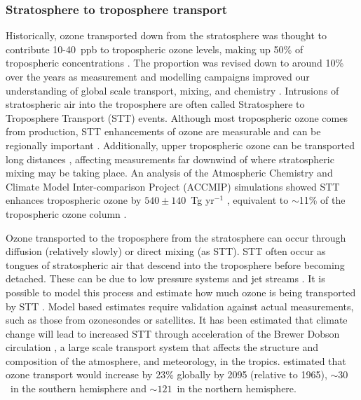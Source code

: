   \subsubsection{Stratosphere to troposphere transport}
    \label{LR:O3:STT}
    Historically, ozone transported down from the stratosphere was thought to contribute 10-40~ppb to tropospheric ozone levels, making up 50\% of tropospheric concentrations \parencite{Atkinson2000, Stohl2003}.
    The proportion was revised down to around 10\% over the years as measurement and modelling campaigns improved our understanding of global scale transport, mixing, and chemistry \parencite{Guenther2006, Monks2015}.
    Intrusions of stratospheric air into the troposphere are often called Stratosphere to Troposphere Transport (STT) events.
    Although most tropospheric ozone comes from production, STT enhancements of 
    ozone are measurable and can be regionally important 
    \parencite[eg.,][]{Jacobson2000, Lelieveld2009, Kuang2017}.
    Additionally, upper tropospheric ozone can be transported long distances 
    \parencite{Cooper2004}, affecting measurements far downwind of where 
    stratospheric mixing may be taking place.
    An analysis of the Atmospheric Chemistry and Climate Model Inter-comparison Project (ACCMIP) simulations showed STT enhances tropospheric ozone by $540\pm140$~Tg yr$^{-1}$ \parencite{Young2013}, equivalent to $\sim$11\% of the tropospheric ozone column \parencite{Monks2015}.
    
    
    Ozone transported to the troposphere from the stratosphere can occur through diffusion (relatively slowly) or direct mixing (as STT).
    STT often occur as tongues of stratospheric air that descend into the troposphere before becoming detached.
    These can be due to low pressure systems and jet streams \parencite{Sprenger2003}.
    It is possible to model this process and estimate how much ozone is being 
    transported by STT \parencite[e.g.,][]{Young2013, Ojha2016}.
    Model based estimates require validation against actual measurements, such as those from ozonesondes or satellites.
    It has been estimated that climate change will lead to increased STT 
    through acceleration of the Brewer Dobson circulation 
    \parencite{Hegglin2009}, a large scale transport system that affects the 
    structure and composition of the atmosphere, and meteorology, in the 
    tropics.
    \textcite{Hegglin2009} estimated that ozone transport would increase by 
    23\% globally by 2095 (relative to 1965), $\sim 30$\tgpyr ~in the southern 
    hemisphere and $\sim 121$\tgpyr ~in the northern hemisphere.
    
